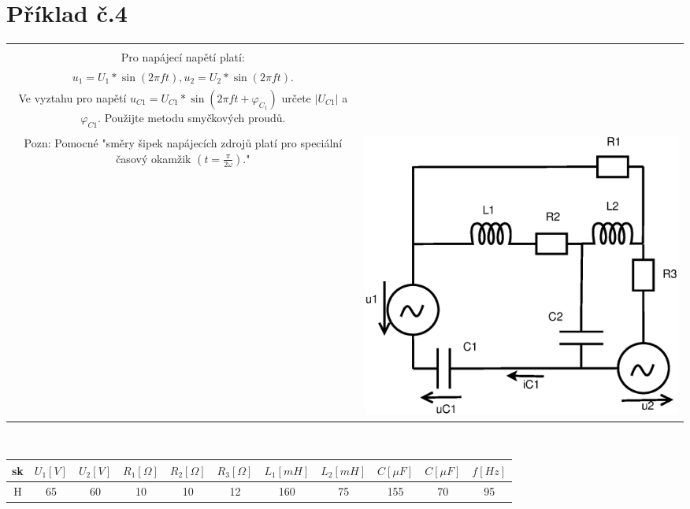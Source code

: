 \documentclass[a4paper, 12pt]{article}
\begin{document}
\section{Příklad č.4}
\begin{tabular}{c c}
    \begin{minipage}{8cm}
        .\\[-6cm]
        Pro napájecí napětí platí: \\
        $u_1 = U_1 * \sin (2\pi ft), u_2 = U_2 * \sin (2\pi ft)$.
        \\
        Ve vyztahu pro napětí $u_{C1} = U_{C1} * \sin (2\pi ft + \varphi_{C_1})$ určete $|U_{C1}|$ a $\varphi_{C1}$. Použijte metodu smyčkových proudů.
        \\
        \\
        Pozn: Pomocné "směry šipek napájecích zdrojů platí pro speciální časový okamžik $ (t = \frac{\pi}{2\omega}) $."
    \end{minipage}
    &
    \includegraphics[scale=0.5]{pr4/dd_1.eps}
\end{tabular}
\\
\begin{tabular}{|c|c|c|c|c|c|c|c|c|c|c|}
    \hline
    sk &$ U_1[V] $&$ U_2[V] $&$ R_1[\Omega] $&$ R_2[\Omega] $&$ R_3[\Omega] $&$ L_1[mH] $&$ L_2[mH] $&$ C[\mu F] $&$ C[\mu F] $&$ f[Hz] $
    
    \\ \hline
    H & 65 & 60 & 10 & 10 & 12 & 160 & 75 & 155 & 70 & 95
    \\ \hline
\end{tabular}
\end{document}
